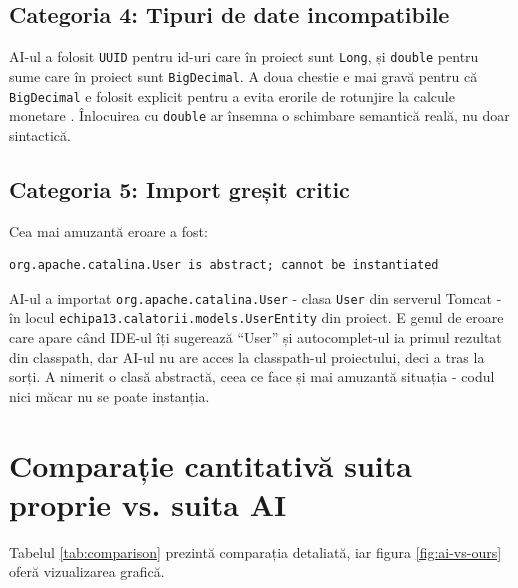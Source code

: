 \subsection{Categoria 4: Tipuri de date incompatibile}

AI-ul a folosit \texttt{UUID} pentru id-uri care în proiect sunt \texttt{Long}, și \texttt{double} pentru sume care în proiect sunt \texttt{BigDecimal}. A doua chestie e mai gravă pentru că \texttt{BigDecimal} e folosit explicit pentru a evita erorile de rotunjire la calcule monetare \cite{martin2008}. Înlocuirea cu \texttt{double} ar însemna o schimbare semantică reală, nu doar sintactică.

\subsection{Categoria 5: Import greșit critic}

Cea mai amuzantă eroare a fost:

\begin{lstlisting}[style=plainstyle]
org.apache.catalina.User is abstract; cannot be instantiated
\end{lstlisting}

AI-ul a importat \texttt{org.apache.catalina.User} - clasa \texttt{User} din serverul Tomcat - în locul \texttt{echipa13.calatorii.models.UserEntity} din proiect. E genul de eroare care apare când IDE-ul îți sugerează \enquote{User} și autocomplet-ul ia primul rezultat din classpath, dar AI-ul nu are acces la classpath-ul proiectului, deci a tras la sorți. A nimerit o clasă abstractă, ceea ce face și mai amuzantă situația - codul nici măcar nu se poate instanția.

\section{Comparație cantitativă suita proprie vs. suita AI}

Tabelul \ref{tab:comparison} prezintă comparația detaliată, iar figura \ref{fig:ai-vs-ours} oferă vizualizarea grafică.

